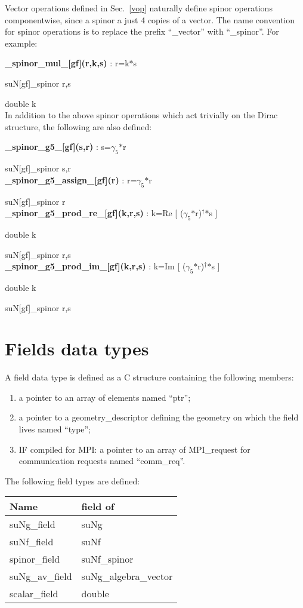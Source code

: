 \documentclass[10pt]{article}
\begin{document}
Vector operations defined in Sec.~\ref{vop} naturally define spinor operations componentwise, since a spinor a just 4 copies of a vector.
The name convention for spinor operations is to replace the prefix ``\_vector'' with ``\_spinor''. For example:

\noindent\textbf{\_spinor\_mul\_[gf](r,k,s) } : r=k$*$s

suN[gf]\_spinor r,s

double k\\

In addition to the above spinor operations which act trivially on the Dirac structure, the following are also defined:


\noindent\textbf{\_spinor\_g5\_[gf](s,r) } : s=$\gamma_5$$*$r

suN[gf]\_spinor s,r\\


\noindent\textbf{\_spinor\_g5\_assign\_[gf](r) } : r=$\gamma_5$$*$r

suN[gf]\_spinor r\\


\noindent\textbf{\_spinor\_g5\_prod\_re\_[gf](k,r,s) } : k=Re [ ($\gamma_5$$*$r)$^\dagger$$*$s ]

double k

suN[gf]\_spinor r,s\\


\noindent\textbf{\_spinor\_g5\_prod\_im\_[gf](k,r,s) } : k=Im [ ($\gamma_5$$*$r)$^\dagger$$*$s ]

double k

suN[gf]\_spinor r,s

\section{Fields data types\label{fields}}

A field data type is defined as a C structure containing the following members:
\begin{enumerate}
\item a pointer to an array of elements named ``ptr'';
\item a pointer to a geometry\_descriptor defining the geometry on which the field lives named ``type'';
\item IF compiled for MPI: a pointer to an array of MPI\_request for communication requests named ``comm\_req''.
\end{enumerate}
The following field types are defined:
\begin{center}
\begin{tabular}{ll}
\hline
Name & field of \\
\hline
\hline
suNg\_field & suNg \\
suNf\_field & suNf \\
spinor\_field & suNf\_spinor \\
suNg\_av\_field & suNg\_algebra\_vector \\
scalar\_field & double
\end{tabular}
\end{center}
\end{document}
